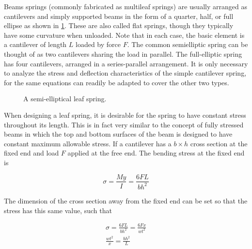 \documentclass[
10pt,
a4paper,
openany,
svgnames,
]{book}
\begin{document}
Beams springs (commonly fabricated as multileaf springs) are usually arranged as cantilevers and simply supported beams in the form of a quarter, half, or full ellipse as shown in \cref{fig: leaf springs}. These are also called flat springs, though they typically have some curvature when unloaded. Note that in each case, the basic element is a cantilever of length $L$ loaded by force $F$. The common semielliptic spring can be thought of as two cantilevers sharing the load in parallel. The full-elliptic spring has four cantilevers, arranged in a series-parallel arrangement. It is only necessary to analyze the stress and deflection characteristics of the simple cantilever spring, for the same equations can readily be adapted to cover the other two types.

\begin{figure}[h]
  \centering
  \caption{A semi-elliptical leaf spring.}
  \label{fig: leaf springs}
\end{figure}
 
When designing a leaf spring, it is desirable for the spring to have constant stress throughout its length. This is in fact very similar to the concept of fully stressed beams in which the top and bottom surfaces of the beam is designed to have constant maximum allowable stress. If a cantilever has a $b \times h$ cross section at the fixed end and load $F$ applied at the free end. The bending stress at the fixed end is

\begin{equation}
  \sigma  = \frac{My}{I} = \frac{6FL}{bh^2}
\end{equation}

The dimension of the cross section away from the fixed end can be set so that the stress has this same value, such that

\begin{equation}
  \begin{gathered}
    \sigma  = \frac{6FL}{bh^2} = \frac{6Fx}{wt^2} \\
    \frac{wt^2}{x} = \frac{bh^2}{L} \\ 
  \end{gathered}
\end{equation}
\end{document}
